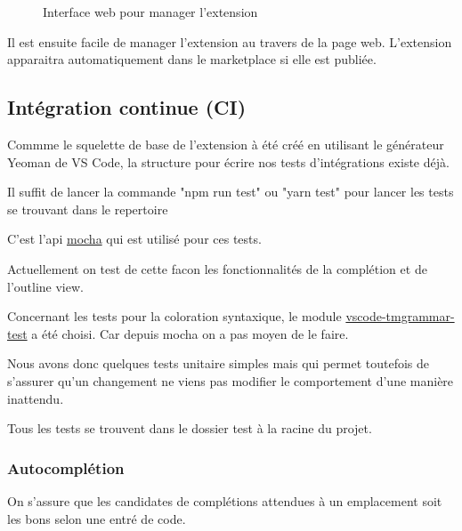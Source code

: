 \documentclass[
    iict, %
    il, %
]{heig-tb}
\begin{document}
\begin{figure}[!h]
    \begin{center}
    \end{center}
    \caption[Interface web pour manager l'extension]{\label{manage-publisher} Interface web pour manager l'extension}
\end{figure}

Il est ensuite facile de manager l'extension au travers de la page web.
L'extension apparaitra automatiquement dans le marketplace si elle est publiée.

\subsection{Intégration continue (CI)}

Commme le squelette de base de l'extension à été créé en utilisant le générateur Yeoman de VS Code, la structure pour écrire nos tests d'intégrations
existe déjà.

Il suffit de lancer la commande "npm run test" ou "yarn test" pour lancer les tests se trouvant dans le repertoire %

C'est l'api \href{https://mochajs.org/api/}{mocha} qui est utilisé pour ces tests.

Actuellement on test de cette facon les fonctionnalités de la complétion et de l'outline view.

Concernant les tests pour la coloration syntaxique, le module \href{https://github.com/PanAeon/vscode-tmgrammar-test}{vscode-tmgrammar-test} a été choisi.
Car depuis mocha on a pas moyen de le faire.

Nous avons donc quelques tests unitaire simples mais qui permet toutefois de s'assurer qu'un changement ne viens pas modifier le comportement d'une manière inattendu.

Tous les tests se trouvent dans le dossier test à la racine du projet. %

\subsubsection{Autocomplétion}
On s'assure que les candidates de complétions attendues à un emplacement soit les bons selon une entré de code.
\end{document}
